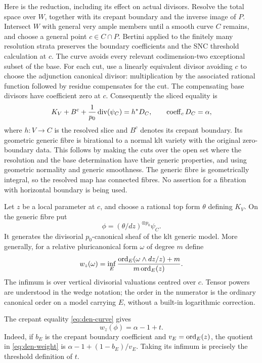 Here is the reduction, including its effect on actual divisors.
Resolve the total space over $W$, together with its crepant boundary
and the inverse image of $P$.  Intersect $W$ with general very ample
members until a smooth curve $C$ remains, and choose a general point
$c\in C\cap P$.  Bertini applied to the finitely many resolution
strata preserves the boundary coefficients and the SNC threshold
calculation at $c$.  The curve avoids every relevant codimension-two
exceptional subset of the base.  For each cut, use a linearly
equivalent divisor avoiding $c$ to choose the adjunction canonical
divisor: multiplication by the associated rational function followed
by residue compensates for the cut.  The compensating base divisors
have coefficient zero at $c$.  Consequently the sliced equality is
\begin{equation}\label{eq:den-curve}
 K_V+B^c+\frac{1}{p_0}\operatorname{div}(\psi_C)=h^*D_C,
 \qquad \operatorname{coeff}_cD_C=\alpha,
\end{equation}
where $h:V\to C$ is the resolved slice and $B^c$ denotes its crepant
boundary.  Its geometric generic fibre is birational to a normal klt
variety with the original zero-boundary data.  This follows by making
the cuts over the open set where the resolution and the base
determination have their generic properties, and using geometric
normality and generic smoothness.  The generic fibre is geometrically
integral, so the resolved map has connected fibres.  No assertion for
a fibration with horizontal boundary is being used.

Let $z$ be a local parameter at $c$, and choose a rational top form
$\theta$ defining $K_V$.  On the generic fibre put
\[
 \phi=(\theta/dz)^{\otimes p_0}\psi_C.
\]
It generates the divisorial $p_0$-canonical sheaf of the klt generic
model.  More generally, for a relative pluricanonical form $\omega$
of degree $m$ define
\begin{equation}\label{eq:den-weight}
 w_z(\omega)=\inf_E
 \frac{\operatorname{ord}_E(\omega\wedge dz/z)+m}{m\operatorname{ord}_E(z)}.
\end{equation}
The infimum is over vertical divisorial valuations centred over $c$.
Tensor powers are understood in the wedge notation; the order in
the numerator is the ordinary canonical order on a model carrying
$E$, without a built-in logarithmic correction.

The crepant equality \eqref{eq:den-curve} gives
\begin{equation}\label{eq:den-weight-threshold}
 w_z(\phi)=\alpha-1+t.
\end{equation}
Indeed, if $b_E$ is the crepant boundary coefficient and
$v_E=\operatorname{ord}_E(z)$, the quotient in \eqref{eq:den-weight} is
$\alpha-1+(1-b_E)/v_E$.  Taking its infimum is precisely the
threshold definition of $t$.

